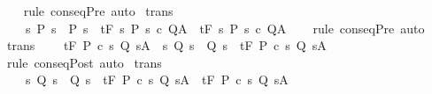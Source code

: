 \begin{isabellebody}
%
\isadelimproof
\ \ %
\endisadelimproof
%
\isatagproof
{}\isamarkupfalse%
\ {\isacharparenleft}rule\ conseqPre{\isacharparenright}\ auto%
\endisatagproof
{\isafoldproof}%
%
\isadelimproof
\isanewline
%
\endisadelimproof
\isanewline
{}\isamarkupfalse%
\ {\isacharbrackleft}trans{\isacharbrackright}{\isacharcolon}\isanewline
\ \ \ \ {\isachardoublequoteopen}{\isacharparenleft}{\isasymAnd}s{\isachardot}\ P{\isacharprime}\ s\ {\isasymlongrightarrow}\ P\ s{\isacharparenright}\ {\isasymLongrightarrow}\ {\isasymGamma}{\isacharcomma}{\isasymTheta}{\isasymturnstile}\isactrlsub t\isactrlbsub {\isacharslash}F\isactrlesub \ {\isacharbraceleft}s{\isachardot}\ P\ s{\isacharbraceright}\ c\ Q{\isacharcomma}A\ {\isasymLongrightarrow}\ {\isasymGamma}{\isacharcomma}{\isasymTheta}{\isasymturnstile}\isactrlsub t\isactrlbsub {\isacharslash}F\isactrlesub \ {\isacharbraceleft}s{\isachardot}\ P{\isacharprime}\ s{\isacharbraceright}\ c\ Q{\isacharcomma}A{\isachardoublequoteclose}\isanewline
%
\isadelimproof
\ \ %
\endisadelimproof
%
\isatagproof
{}\isamarkupfalse%
\ {\isacharparenleft}rule\ conseqPre{\isacharparenright}\ auto%
\endisatagproof
{\isafoldproof}%
%
\isadelimproof
\isanewline
%
\endisadelimproof
\isanewline
{}\isamarkupfalse%
\ {\isacharbrackleft}trans{\isacharbrackright}{\isacharcolon}\isanewline
\ \ \ \ {\isachardoublequoteopen}{\isasymGamma}{\isacharcomma}{\isasymTheta}{\isasymturnstile}\isactrlsub t\isactrlbsub {\isacharslash}F\isactrlesub \ P\ c\ {\isacharbraceleft}s{\isachardot}\ Q\ s{\isacharbraceright}{\isacharcomma}A\ {\isasymLongrightarrow}\ {\isacharparenleft}{\isasymAnd}s{\isachardot}\ Q\ s\ {\isasymlongrightarrow}\ Q{\isacharprime}\ s{\isacharparenright}\ {\isasymLongrightarrow}\ {\isasymGamma}{\isacharcomma}{\isasymTheta}{\isasymturnstile}\isactrlsub t\isactrlbsub {\isacharslash}F\isactrlesub \ P\ c\ {\isacharbraceleft}s{\isachardot}\ Q{\isacharprime}\ s{\isacharbraceright}{\isacharcomma}A{\isachardoublequoteclose}\isanewline
%
\isadelimproof
\ \ %
\endisadelimproof
%
\isatagproof
{}\isamarkupfalse%
\ {\isacharparenleft}rule\ conseqPost{\isacharparenright}\ auto%
\endisatagproof
{\isafoldproof}%
%
\isadelimproof
\isanewline
%
\endisadelimproof
\isanewline
{}\isamarkupfalse%
\ {\isacharbrackleft}trans{\isacharbrackright}{\isacharcolon}\isanewline
\ \ \ \ {\isachardoublequoteopen}{\isacharparenleft}{\isasymAnd}s{\isachardot}\ Q\ s\ {\isasymlongrightarrow}\ Q{\isacharprime}\ s{\isacharparenright}\ {\isasymLongrightarrow}\ {\isasymGamma}{\isacharcomma}{\isasymTheta}{\isasymturnstile}\isactrlsub t\isactrlbsub {\isacharslash}F\isactrlesub \ P\ c\ {\isacharbraceleft}s{\isachardot}\ Q\ s{\isacharbraceright}{\isacharcomma}A\ {\isasymLongrightarrow}\ {\isasymGamma}{\isacharcomma}{\isasymTheta}{\isasymturnstile}\isactrlsub t\isactrlbsub {\isacharslash}F\isactrlesub \ P\ c\ {\isacharbraceleft}s{\isachardot}\ Q{\isacharprime}\ s{\isacharbraceright}{\isacharcomma}A{\isachardoublequoteclose}\isanewline

\end{isabellebody}
